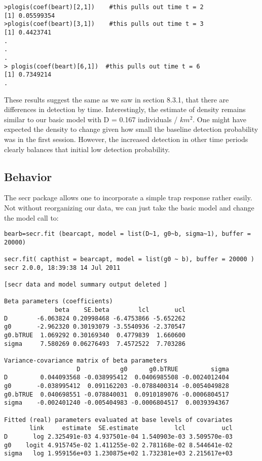 \begin{verbatim}
>plogis(coef(beart)[2,1])    #this pulls out time t = 2
[1] 0.05599354
>plogis(coef(beart)[3,1])    #this pulls out time t = 3
[1] 0.4423741
.
.
.
> plogis(coef(beart)[6,1])  #this pulls out time t = 6
[1] 0.7349214
.
\end{verbatim}

These results suggest the same as we saw in section 8.3.1, that there
are differences in detection by time.  Interestingly, the estimate of
density remains similar to our basic model with D = 0.167 individuals
/ $km ^2$.   One might have expected the density to change given how
small the baseline detection probability was in the first session.
However, the increased detection in other time periods clearly
balances that initial low detection probability.

\subsection{Behavior}

The secr package allows one to incorporate a simple trap response rather easily.  Not without reorganizing our data, we can just take the basic model and change the model call to:

\begin{verbatim}
bearb=secr.fit (bearcapt, model = list(D~1, g0~b, sigma~1), buffer = 20000)

secr.fit( capthist = bearcapt, model = list(g0 ~ b), buffer = 20000 )
secr 2.0.0, 18:39:38 14 Jul 2011

[secr data and model summary output deleted ]

Beta parameters (coefficients) 
              beta    SE.beta        lcl       ucl
D        -6.063824 0.20998468 -6.4753866 -5.652262
g0       -2.962320 0.30193079 -3.5540936 -2.370547
g0.bTRUE  1.069292 0.30169340  0.4779839  1.660600
sigma     7.580269 0.06276493  7.4572522  7.703286

Variance-covariance matrix of beta parameters 
                    D           g0      g0.bTRUE         sigma
D         0.044093568 -0.038995412  0.0406985508 -0.0024012404
g0       -0.038995412  0.091162203 -0.0788400314 -0.0054049828
g0.bTRUE  0.040698551 -0.078840031  0.0910189076 -0.0006804517
sigma    -0.002401240 -0.005404983 -0.0006804517  0.0039394367

Fitted (real) parameters evaluated at base levels of covariates 
       link     estimate  SE.estimate          lcl          ucl
D       log 2.325491e-03 4.937501e-04 1.540903e-03 3.509570e-03
g0    logit 4.915745e-02 1.411255e-02 2.781168e-02 8.544641e-02
sigma   log 1.959156e+03 1.230875e+02 1.732381e+03 2.215617e+03
\end{verbatim}

